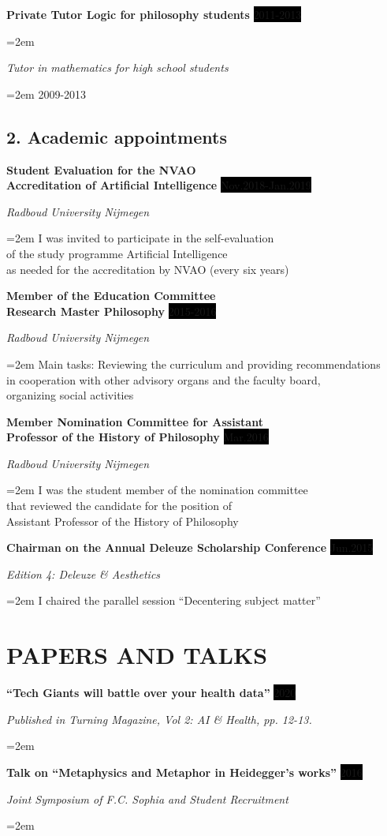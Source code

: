 \documentclass{article}
\newcommand{\sepspace}{\vspace*{1em}}		%
\newcommand{\NewPart}[1]{\section*{\uppercase{#1}}}
\newcommand{\EducationEntry}[4]{
		\noindent \textbf{#1} \hfill      %
		\colorbox{Black}{%
			\parbox{6em}{%
			\hfill\color{White}#2}} \par  %
		\noindent \textit{#3} \par        %
		\noindent\hangindent=2em\hangafter=0 \small #4 %
		\normalsize \par}
\newcommand{\WorkEntry}[4]{				  %
		\noindent \textbf{#1} \hfill      %
		\colorbox{Black}{\color{White}#2} \par  %
		\noindent \textit{#3} \par              %
		\noindent\hangindent=2em\hangafter=0 \small #4 %
		\normalsize \par}
\begin{document}
\WorkEntry{Private Tutor Logic for philosophy students}{2011-2013}{}

\WorkEntry{Tutor in mathematics for high school students}{2009-2013}{}

\subsection*{2. Academic appointments}

\WorkEntry{Student Evaluation for the NVAO\\ Accreditation of Artificial Intelligence}{Nov.2018-Jan.2019}{Radboud University Nijmegen}{I was invited to participate in the self-evaluation\\of the study programme Artificial Intelligence\\ as needed for the accreditation by NVAO (every six years)}
\sepspace

\WorkEntry{Member of the Education Committee\\ Research Master Philosophy}{2015-2016}{Radboud University Nijmegen}{Main tasks: Reviewing the curriculum and providing recommendations\\ in cooperation with other advisory organs and the faculty board,\\ organizing social activities}
\sepspace

\WorkEntry{Member Nomination Committee for Assistant\\ Professor of the History of Philosophy}{Mar.2016}{Radboud University Nijmegen}{I was the student member of the nomination committee\\ that reviewed the candidate for the position of\\ Assistant Professor of the History of Philosophy}
\sepspace

\WorkEntry{Chairman on the Annual Deleuze Scholarship Conference}{Jun.2015}{Edition 4: Deleuze \& Aesthetics}{I chaired the parallel session ``Decentering subject matter'' }
\sepspace

\NewPart{Papers and talks}

\WorkEntry{``Tech Giants will battle over your health data''}{2020}{Published in \textit{Turning Magazine}, Vol 2: AI \& Health, pp. 12-13.}
\sepspace

\WorkEntry{Talk on ``Metaphysics and Metaphor in Heidegger's works''}{2016}{Joint Symposium of F.C. Sophia and Student Recruitment}
\sepspace
\end{document}
